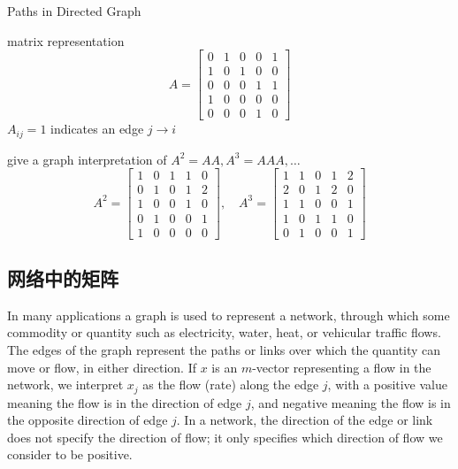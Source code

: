 \begin{example}[路径矩阵]
\begin{FigureCenter}{Paths in Directed Graph}
\begin{tikzpicture}[x=0.75pt,y=0.75pt,yscale=-1,xscale=1]
\end{tikzpicture}
\end{FigureCenter}


    matrix representation
\begin{equation}
A=\left[\begin{array}{lllll}
0 & 1 & 0 & 0 & 1 \\
1 & 0 & 1 & 0 & 0 \\
0 & 0 & 0 & 1 & 1 \\
1 & 0 & 0 & 0 & 0 \\
0 & 0 & 0 & 1 & 0
\end{array}\right]
\end{equation}
$ A_{i j}=1 $ indicates an edge $ j \rightarrow i $

    give a graph interpretation of $ A^{2}=A A, A^{3}=A A A, \ldots $
\begin{equation}
A^{2}=\left[\begin{array}{lllll}
1 & 0 & 1 & 1 & 0 \\
0 & 1 & 0 & 1 & 2 \\
1 & 0 & 0 & 1 & 0 \\
0 & 1 & 0 & 0 & 1 \\
1 & 0 & 0 & 0 & 0
\end{array}\right], \quad A^{3}=\left[\begin{array}{lllll}
1 & 1 & 0 & 1 & 2 \\
2 & 0 & 1 & 2 & 0 \\
1 & 1 & 0 & 0 & 1 \\
1 & 0 & 1 & 1 & 0 \\
0 & 1 & 0 & 0 & 1
\end{array}\right]
\end{equation}
\end{example}


\subsection{网络中的矩阵}

In many applications a graph is used to represent a network, through which some commodity or quantity such as electricity, water, heat, or vehicular traffic flows. The edges of the graph represent the paths or links over which the quantity can move or flow, in either direction. If $ x $ is an $ m $-vector representing a flow in the network, we interpret $ x_{j} $ as the flow (rate) along the edge $ j $, with a positive value meaning the flow is in the direction of edge $ j $, and negative meaning the flow is in the opposite direction of edge $ j $. In a network, the direction of the edge or link does not specify the direction of flow; it only specifies which direction of flow we consider to be positive.


